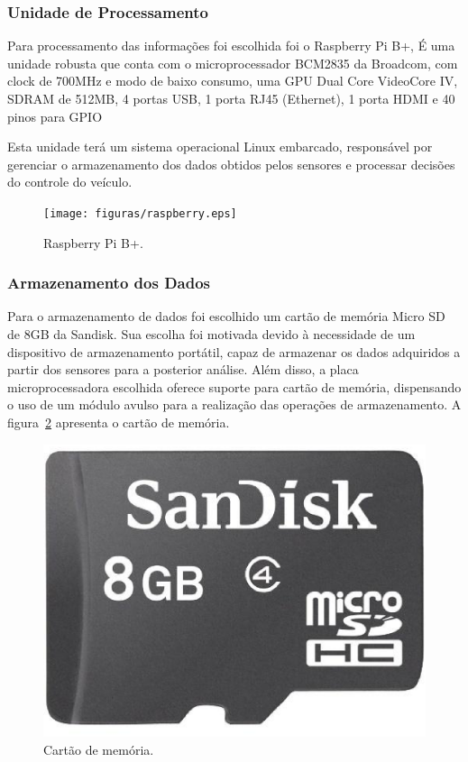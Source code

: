   \subsubsection{Unidade de Processamento}

  Para processamento das informações foi
  escolhida foi o Raspberry Pi B+,
  É uma unidade robusta que conta com o microprocessador
  BCM2835 da Broadcom, com clock de
  700MHz e modo de baixo consumo, uma GPU Dual Core VideoCore
  IV\textregistered, SDRAM de 512MB, 4 portas USB, 1 porta RJ45
  (Ethernet), 1 porta HDMI e 40 pinos para GPIO~\cite{raspref}

  Esta unidade terá um sistema operacional Linux embarcado, responsável
  por gerenciar o armazenamento dos dados obtidos pelos sensores e
  processar decisões do controle do veículo.

  \begin{figure}[!htbp]
  \begin{center}
  \texttt{[image: figuras/raspberry.eps]}
  \caption{\label{fig:raspberry}Raspberry Pi B+.}
  \end{center}
  \end{figure}

  \subsubsection{Armazenamento dos Dados}

  Para o armazenamento de dados foi escolhido um cartão de memória
  Micro SD de 8GB da Sandisk. Sua escolha foi motivada devido à
  necessidade de um dispositivo de armazenamento portátil, capaz de
  armazenar os dados adquiridos a partir dos sensores para a posterior
  análise. Além disso, a placa microprocessadora escolhida oferece
  suporte para cartão de memória, dispensando o uso de um módulo avulso
  para a realização das operações de armazenamento. A figura~\ref{fig:sdcard}
  apresenta o cartão de memória.

  \begin{figure}[!htbp]
  \begin{center}
  \includegraphics[width=.5\textwidth]{figuras/sdcard.eps}
  \caption{\label{fig:sdcard}Cartão de memória.}
  \end{center}
  \end{figure}

